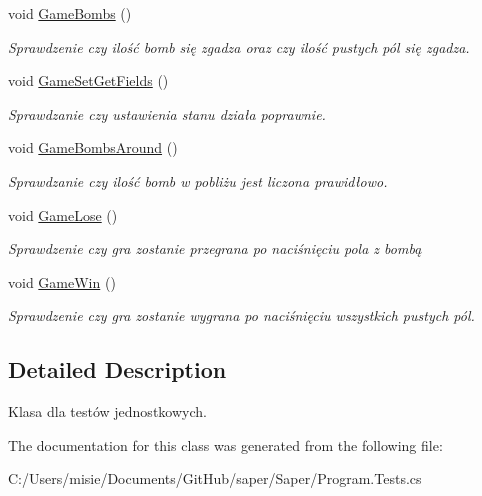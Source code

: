 \begin{DoxyCompactItemize}
void \mbox{\hyperlink{class_saper_1_1_tests_1_1_program_tests_ad11f91c967457113e7ee5f43c4ff54a1}{Game\+Bombs}} ()
\begin{DoxyCompactList}\small\item\em Sprawdzenie czy ilość bomb się zgadza oraz czy ilość pustych pól się zgadza. \end{DoxyCompactList}\item 
\mbox{\label{class_saper_1_1_tests_1_1_program_tests_afbf5122edc7a9945db74f8ecad4cae41}} 
void \mbox{\hyperlink{class_saper_1_1_tests_1_1_program_tests_afbf5122edc7a9945db74f8ecad4cae41}{Game\+Set\+Get\+Fields}} ()
\begin{DoxyCompactList}\small\item\em Sprawdzanie czy ustawienia stanu działa poprawnie. \end{DoxyCompactList}\item 
\mbox{\label{class_saper_1_1_tests_1_1_program_tests_a5385fbe423cd40ca4674ddc0060a2752}} 
void \mbox{\hyperlink{class_saper_1_1_tests_1_1_program_tests_a5385fbe423cd40ca4674ddc0060a2752}{Game\+Bombs\+Around}} ()
\begin{DoxyCompactList}\small\item\em Sprawdzanie czy ilość bomb w pobliżu jest liczona prawidłowo. \end{DoxyCompactList}\item 
\mbox{\label{class_saper_1_1_tests_1_1_program_tests_a8a3221efdf3b62166f012dcf7e1ce68c}} 
void \mbox{\hyperlink{class_saper_1_1_tests_1_1_program_tests_a8a3221efdf3b62166f012dcf7e1ce68c}{Game\+Lose}} ()
\begin{DoxyCompactList}\small\item\em Sprawdzenie czy gra zostanie przegrana po naciśnięciu pola z bombą \end{DoxyCompactList}\item 
\mbox{\label{class_saper_1_1_tests_1_1_program_tests_a9a2abea95633c70b2845c44e017399cb}} 
void \mbox{\hyperlink{class_saper_1_1_tests_1_1_program_tests_a9a2abea95633c70b2845c44e017399cb}{Game\+Win}} ()
\begin{DoxyCompactList}\small\item\em Sprawdzenie czy gra zostanie wygrana po naciśnięciu wszystkich pustych pól. \end{DoxyCompactList}\end{DoxyCompactItemize}


\subsection{Detailed Description}
Klasa dla testów jednostkowych. 

The documentation for this class was generated from the following file\+:\begin{DoxyCompactItemize}
\item 
C\+:/\+Users/misie/\+Documents/\+Git\+Hub/saper/\+Saper/Program.\+Tests.\+cs\end{DoxyCompactItemize}
